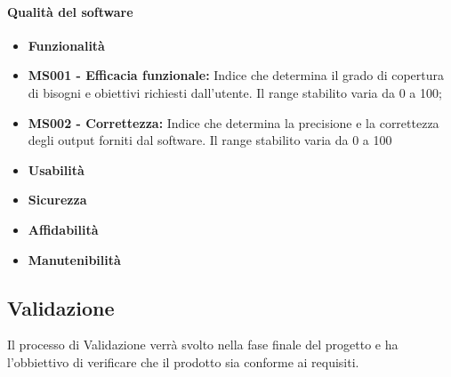 \paragraph{Qualità del software} 
\begin{itemize}
	\item []\textbf{Funzionalità}%
	\item \textbf{MS001 - Efficacia funzionale:} Indice che determina il grado di copertura di bisogni e obiettivi richiesti dall'utente. Il range stabilito varia da 0 a 100;
	\item \textbf{MS002 - Correttezza:} Indice che determina la precisione e la correttezza degli output forniti dal software. Il range stabilito varia da 0 a 100
	\item []\textbf{Usabilità}%
	\item []\textbf{Sicurezza}%
	\item []\textbf{Affidabilità}%
	\item []\textbf{Manutenibilità}%



\end{itemize}







\subsection{Validazione}
Il processo di Validazione verrà svolto nella fase finale del progetto e ha l'obbiettivo di verificare che il prodotto sia conforme ai requisiti.